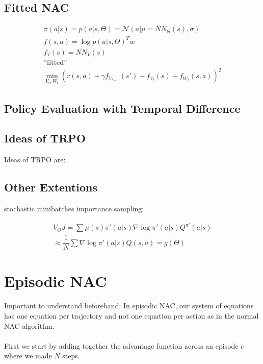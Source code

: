 \subsection{Fitted NAC}

\begin{align}
	\pi(a|s) = p(a|s, \Theta) = \mathcal{N}(a|\mu = NN_{\Theta}(s), \sigma) \\
	f(s,a) = \log p(a|s, \Theta)^T w \\
	f_V(s) = NN_V(s) \\
	\text{''fitted''}\\
	\min_{V_t, W_t} (r(s,a) + \gamma f_{V_{t+1}}(s') - f_{V_t}(s) + f_{W_t}(s,a))^2
\end{align}

\subsection{Policy Evaluation with Temporal Difference}
\cite{dann2014policy}


\subsection{Ideas of TRPO}
Ideas of TRPO are:
\begin{itemize}
	\x 
\end{itemize}


\subsection{Other Extentions}

\begin{itemize}
	\x stochastic
	\x minibatches
	\x importance sampling:
\end{itemize}

\begin{align}
	V_{\Theta} J = \sum \mu(s) \pi'(a|s) \nabla \log \pi'(a|s) Q^{\pi'}(a|s) \\
	\approx \dfrac{1}{N} \sum \nabla \log \pi'(a|s) Q(s,a) = g(\Theta)
\end{align}





\section{Episodic NAC}
Important to understand beforehand: In episodic NAC, our system of equations has one equation per trajectory and not one equation per action as in the normal NAC algorithm.
\\\\
First we start by adding together the advantage function across an episode $e$ where we made $N$ steps.

